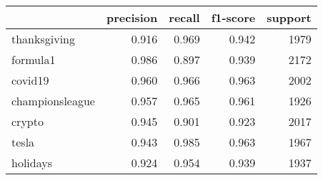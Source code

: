 \begin{tabular}{lrrrr}
\toprule
{} &  precision &  recall &  f1-score &  support \\
\midrule
thanksgiving    &      0.916 &   0.969 &     0.942 &     1979 \\
formula1        &      0.986 &   0.897 &     0.939 &     2172 \\
covid19         &      0.960 &   0.966 &     0.963 &     2002 \\
championsleague &      0.957 &   0.965 &     0.961 &     1926 \\
crypto          &      0.945 &   0.901 &     0.923 &     2017 \\
tesla           &      0.943 &   0.985 &     0.963 &     1967 \\
holidays        &      0.924 &   0.954 &     0.939 &     1937 \\
\bottomrule
\end{tabular}


